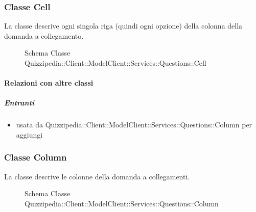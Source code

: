 \subsubsection{Classe Cell}
La classe descrive ogni singola riga (quindi ogni opzione) della colonna della domanda a collegamento.
\begin{figure}[H]
\centering
\noindent{}
\caption[Schema Classe Cell]{Schema Classe Quizzipedia::Client::ModelClient::Services::Questions::Cell}
\end{figure}
\paragraph{Relazioni con altre classi}
\subparagraph{Entranti}
\begin{itemize}
\item usata da Quizzipedia::Client::ModelClient::Services::Questions::Column per aggiungi
\end{itemize}
\subsubsection{Classe Column}
La classe descrive le colonne della domanda a collegamenti.
\begin{figure}[H]
\centering
\noindent{}
\caption[Schema Classe Column]{Schema Classe Quizzipedia::Client::ModelClient::Services::Questions::Column}
\end{figure}
